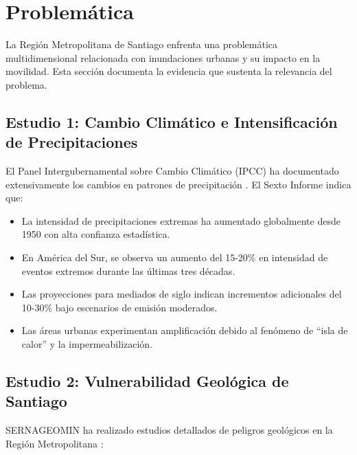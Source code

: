\documentclass[conference]{IEEEtran}
\begin{document}
\section{Problemática}

La Región Metropolitana de Santiago enfrenta una problemática multidimensional relacionada con inundaciones urbanas y su impacto en la movilidad. Esta sección documenta la evidencia que sustenta la relevancia del problema.

\subsection{Estudio 1: Cambio Climático e Intensificación de Precipitaciones}

El Panel Intergubernamental sobre Cambio Climático (IPCC) ha documentado extensivamente los cambios en patrones de precipitación \citep{ipcc2021}. El Sexto Informe indica que:

\begin{itemize}
    \item La intensidad de precipitaciones extremas ha aumentado globalmente desde 1950 con alta confianza estadística.
    \item En América del Sur, se observa un aumento del 15-20\% en intensidad de eventos extremos durante las últimas tres décadas.
    \item Las proyecciones para mediados de siglo indican incrementos adicionales del 10-30\% bajo escenarios de emisión moderados.
    \item Las áreas urbanas experimentan amplificación debido al fenómeno de ``isla de calor'' y la impermeabilización.
\end{itemize}

\subsection{Estudio 2: Vulnerabilidad Geológica de Santiago}

SERNAGEOMIN ha realizado estudios detallados de peligros geológicos en la Región Metropolitana \citep{sernageomin2020}:
\end{document}
